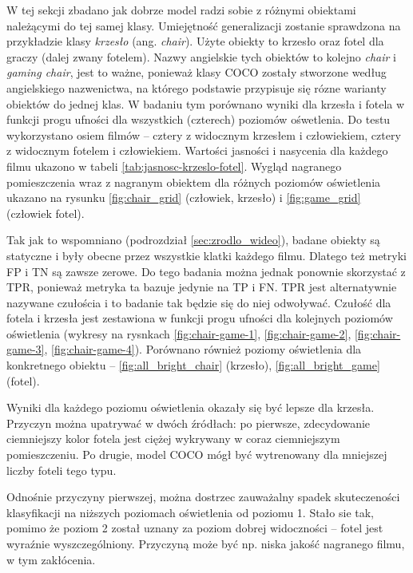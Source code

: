 W tej sekcji zbadano jak dobrze model radzi sobie z różnymi obiektami należącymi do tej samej klasy. Umiejętność generalizacji zostanie sprawdzona na przykładzie klasy \emph{krzesło} (ang. \emph{chair}). Użyte obiekty to krzesło oraz fotel dla graczy (dalej zwany fotelem). Nazwy angielskie tych obiektów to kolejno \emph{chair} i \emph{gaming chair}, jest to ważne, ponieważ klasy COCO zostały stworzone według angielskiego nazwenictwa, na którego podstawie przypisuje się rózne warianty obiektów do jednej klas.  W badaniu tym porównano wyniki dla krzesła i fotela w funkcji progu ufności dla wszystkich (czterech) poziomów ośwetlenia. Do testu wykorzystano osiem filmów -- cztery z widocznym krzesłem i człowiekiem, cztery z widocznym fotelem i człowiekiem. Wartości jasności i nasycenia dla każdego filmu ukazono w tabeli \ref{tab:jasnosc-krzeslo-fotel}. Wygląd nagranego pomieszczenia wraz z nagranym obiektem dla różnych poziomów oświetlenia ukazano na rysunku \ref{fig:chair_grid} (człowiek, krzesło) i 
\ref{fig:game_grid} (człowiek fotel). 


Tak jak to wspomniano (podrozdział \ref{sec:zrodlo_wideo}), badane obiekty są statyczne i były obecne przez wszystkie klatki każdego filmu. Dlatego też metryki FP i TN są zawsze zerowe. Do tego badania można jednak ponownie skorzystać z TPR, ponieważ metryka ta bazuje jedynie na TP i FN. TPR jest alternatywnie nazywane czułościa i to badanie tak będzie się do niej odwoływać. Czułość dla fotela i krzesła jest zestawiona w funkcji progu ufności dla kolejnych poziomów oświetlenia (wykresy na rysnkach \ref{fig:chair-game-1}, \ref{fig:chair-game-2}, \ref{fig:chair-game-3}, \ref{fig:chair-game-4}). Porównano również poziomy oświetlenia dla konkretnego obiektu -- \ref{fig:all_bright_chair} (krzesło), \ref{fig:all_bright_game} (fotel). 

Wyniki dla każdego poziomu oświetlenia okazały się być lepsze dla krzesła. Przyczyn można upatrywać w dwóch źródłach: po pierwsze, zdecydowanie ciemniejszy kolor fotela jest ciężej wykrywany w coraz ciemniejszym pomieszczeniu. Po drugie, model COCO mógł być wytrenowany dla mniejszej liczby foteli tego typu.

Odnośnie przyczyny pierwszej, można dostrzec zauważalny spadek skuteczeności klasyfikacji na niższych poziomach oświetlenia od poziomu 1. Stało sie tak, pomimo że poziom 2 został uznany za poziom dobrej widoczności -- fotel jest wyraźnie wyszczególniony. Przyczyną może być np. niska jakość nagranego filmu, w tym zakłócenia. 

